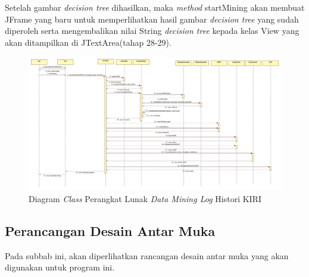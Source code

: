 Setelah gambar \textsl{decision tree} dihasilkan, maka \textsl{method} startMining akan membuat JFrame yang baru untuk memperlihatkan hasil gambar \textsl{decision tree} yang sudah diperoleh serta mengembalikan nilai String \textsl{decision tree} kepada kelas View yang akan ditampilkan di JTextArea(tahap 28-29).


\begin{figure}[H]
\includegraphics[scale=0.35, angle =90]{Gambar/sequenceDiagram.jpg}
\caption[Diagram \textsl{Class} Perangkat Lunak \textsl{Data Mining Log} Histori KIRI]{Diagram \textsl{Class} Perangkat Lunak \textsl{Data Mining Log} Histori KIRI} 
\label{fig:sequenceDiagram}
\end{figure}

\subsection{Perancangan Desain Antar Muka}

Pada subbab ini, akan diperlihatkan rancangan desain antar muka yang akan digunakan untuk program ini.

